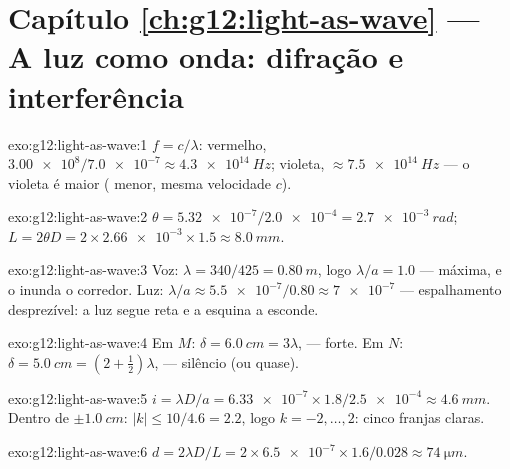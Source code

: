\section*{Capítulo \ref{ch:g12:light-as-wave} --- A luz como onda: difração e interferência}

\begin{solution}{exo:g12:light-as-wave:1}
$f = c/\lambda$: vermelho, $\num{3.00e8}/\num{7.0e-7} \approx
\qty{4.3e14}{Hz}$; violeta, $\approx \qty{7.5e14}{Hz}$ --- o violeta é
maior ( menor, mesma velocidade $c$).
\end{solution}

\begin{solution}{exo:g12:light-as-wave:2}
$\theta = \num{5.32e-7}/\num{2.0e-4} = \qty{2.7e-3}{rad}$;
$L = 2\theta D = 2 \times \num{2.66e-3} \times 1.5 \approx
\qty{8.0}{mm}$.
\end{solution}

\begin{solution}{exo:g12:light-as-wave:3}
Voz: $\lambda = 340/425 = \qty{0.80}{m}$, logo $\lambda/a = 1.0$ ---
 máxima, e o  inunda o corredor. Luz:
$\lambda/a \approx \num{5.5e-7}/0.80 \approx \num{7e-7}$ ---
espalhamento desprezível: a luz segue reta e a esquina a esconde.
\end{solution}

\begin{solution}{exo:g12:light-as-wave:4}
Em $M$: $\delta = \qty{6.0}{cm} = 3\lambda$,  ---  forte.
Em $N$: $\delta = \qty{5.0}{cm} = (2 + \tfrac12)\lambda$,  ---
silêncio (ou quase).
\end{solution}

\begin{solution}{exo:g12:light-as-wave:5}
$i = \lambda D/a = \num{6.33e-7} \times 1.8/\num{2.5e-4} \approx
\qty{4.6}{mm}$. Dentro de $\pm\qty{1.0}{cm}$: $|k| \leq 10/4.6 = 2.2$,
logo $k = -2, \dots, 2$: cinco franjas claras.
\end{solution}

\begin{solution}{exo:g12:light-as-wave:6}
$d = 2\lambda D/L = 2 \times \num{6.5e-7} \times 1.6/0.028 \approx
\qty{74}{\micro m}$.
\end{solution}

